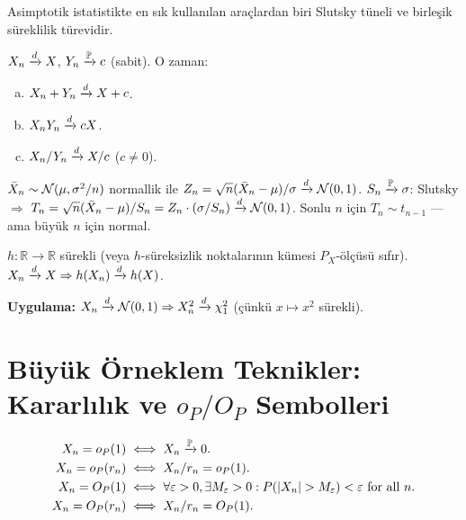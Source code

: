 Asimptotik istatistikte en sık kullanılan araçlardan biri Slutsky tüneli ve birleşik süreklilik türevidir.

\begin{teorem}\label{app:thm:slutsky}
$X_n\xrightarrow{d} X$, $Y_n\xrightarrow{\mathbb{P}} c$ (sabit). O zaman:
\begin{enumerate}[(a)]
  \item $X_n+Y_n\xrightarrow{d} X+c$.
  \item $X_nY_n\xrightarrow{d} cX$.
  \item $X_n/Y_n\xrightarrow{d} X/c$ ($c\neq0$).
\end{enumerate}
\end{teorem}

\begin{ornek}\label{app:ex:t_slutsky}
$\bar X_n\sim\mathcal{N}(\mu,\sigma^2/n)$ normallik ile $Z_n=\sqrt{n}(\bar X_n-\mu)/\sigma\xrightarrow{d}\mathcal{N}(0,1)$.
$S_n\xrightarrow{\mathbb{P}}\sigma$: Slutsky $\Rightarrow$ $T_n=\sqrt{n}(\bar X_n-\mu)/S_n=Z_n\cdot(\sigma/S_n)\xrightarrow{d}\mathcal{N}(0,1)$.
Sonlu $n$ için $T_n\sim t_{n-1}$ — ama büyük $n$ için normal.
\end{ornek}

\begin{teorem}\label{app:thm:cont_mapping}
$h:\mathbb{R}\to\mathbb{R}$ sürekli (veya $h$-süreksizlik noktalarının kümesi $P_X$-ölçüsü sıfır). $X_n\xrightarrow{d} X\Rightarrow h(X_n)\xrightarrow{d} h(X)$.
\end{teorem}

\noindent\textbf{Uygulama:} $X_n\xrightarrow{d}\mathcal{N}(0,1)\Rightarrow X_n^2\xrightarrow{d}\chi^2_1$ (çünkü $x\mapsto x^2$ sürekli).

\section{Büyük Örneklem Teknikler: Kararlılık ve $o_P / O_P$ Sembolleri}
\label{app:op_sembolleri}

\begin{tanim}[$o_P$ ve $O_P$]\label{app:def:op}
\begin{align*}
  X_n = o_P(1) &\iff X_n\pto0.\\
  X_n = o_P(r_n) &\iff X_n/r_n = o_P(1).\\
  X_n = O_P(1) &\iff \forall\varepsilon>0,\exists M_\varepsilon>0: P(|X_n|>M_\varepsilon)<\varepsilon \text{ for all }n.\\
  X_n = O_P(r_n) &\iff X_n/r_n = O_P(1).
\end{align*}
\end{tanim}

